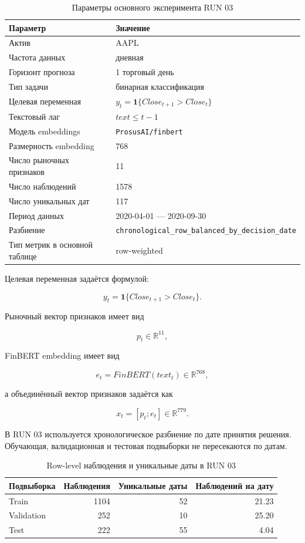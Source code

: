 \begin{table}[htbp]
\centering
\begin{tabular}{ll}
\toprule
Параметр & Значение \\
\midrule
Актив & AAPL \\
Частота данных & дневная \\
Горизонт прогноза & 1 торговый день \\
Тип задачи & бинарная классификация \\
Целевая переменная & $y_t = \mathbf{1}\{Close_{t+1} > Close_t\}$ \\
Текстовый лаг & $text \leq t-1$ \\
Модель embeddings & \texttt{ProsusAI/finbert} \\
Размерность embedding & 768 \\
Число рыночных признаков & 11 \\
Число наблюдений & 1578 \\
Число уникальных дат & 117 \\
Период данных & 2020-04-01 --- 2020-09-30 \\
Разбиение & \texttt{chronological\_row\_balanced\_by\_decision\_date} \\
Тип метрик в основной таблице & row-weighted \\
\bottomrule
\end{tabular}
\caption{Параметры основного эксперимента RUN 03}
\label{tab:appendix_run03_params}
\end{table}

Целевая переменная задаётся формулой:

\[
y_t = \mathbf{1}\{Close_{t+1} > Close_t\}.
\]

Рыночный вектор признаков имеет вид

\[
p_t \in \mathbb{R}^{11},
\]

FinBERT embedding имеет вид

\[
e_t = FinBERT(text_t) \in \mathbb{R}^{768},
\]

а объединённый вектор признаков задаётся как

\[
x_t = [p_t;e_t] \in \mathbb{R}^{779}.
\]

В RUN 03 используется хронологическое разбиение по дате принятия решения. Обучающая, валидационная и тестовая подвыборки не пересекаются по датам.

\begin{table}[htbp]
\centering
\begin{tabular}{lrrr}
\toprule
Подвыборка & Наблюдения & Уникальные даты & Наблюдений на дату \\
\midrule
Train & 1104 & 52 & 21.23 \\
Validation & 252 & 10 & 25.20 \\
Test & 222 & 55 & 4.04 \\
\bottomrule
\end{tabular}
\caption{Row-level наблюдения и уникальные даты в RUN 03}
\label{tab:appendix_run03_rows_dates}
\end{table}

